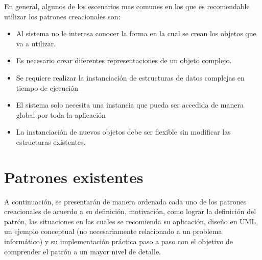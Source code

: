 En general, algunos de los escenarios mas comunes en los que es recomendable utilizar los patrones creacionales son:

\begin{itemize}
	\item Al sistema no le interesa conocer la forma en la cual se crean los objetos que va a utilizar.
	\item Es necesario crear diferentes representaciones de un objeto complejo.
	\item Se requiere realizar la instanciación de estructuras de datos complejas en tiempo de ejecución
	\item El sistema solo necesita una instancia que pueda ser accedida de manera global por toda la aplicación
	\item La instanciación de nuevos objetos debe ser flexible sin modificar las estructuras existentes.
\end{itemize}

\section{Patrones existentes}

A continuación, se presentarán de manera ordenada cada uno de los patrones creacionales de acuerdo a su definición, motivación, como lograr la definición del patrón, las situaciones en las cuales se recomienda su aplicación, diseño en UML, un ejemplo conceptual (no necesariamente relacionado a un problema informático) y su implementación práctica paso a paso con el objetivo de comprender el patrón a un mayor nivel de detalle.




